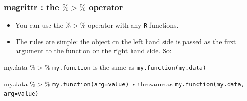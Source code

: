 \documentclass{beamer}
\begin{document}
\begin{frame}
	\frametitle{magrittr :  the $\%>\%$ operator}
	\large
	\begin{itemize}
		\item You can use the $\%>\%$ operator with any \texttt{R} functions.
		\item The rules are simple: the object on the left hand side is passed as the first argument to the function on the right hand side. So: 
	\end{itemize}
	\begin{framed}	
		my.data $\%>\%$ \texttt{my.function} is the same as \texttt{my.function(my.data)}
		
		my.data $\%>\%$ \texttt{my.function(arg=value)} is the same as \texttt{my.function(my.data, arg=value)}
	\end{framed}
	
\end{frame}
%		
%	
%	
%	
%		
%		
\end{document}
